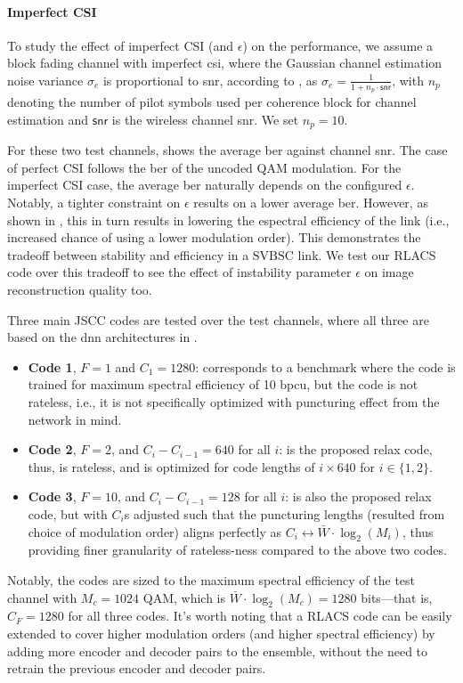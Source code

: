 \paragraph*{Imperfect CSI} To study the effect of imperfect CSI (and $\epsilon$) on the performance, we assume a  block fading channel with imperfect  \gls{csi}, where the Gaussian channel estimation noise variance $\sigma_e$ is proportional to \gls{snr}, according to \cite{1193803,9206086}, as  $\sigma_e = \frac{1}{1+n_p \cdot \mathsf{snr}}$, with $n_p$ denoting the number of pilot symbols used per coherence block for channel estimation and $\mathsf{snr}$ is the wireless channel \gls{snr}. We set $n_p = 10$.

For these two test channels,  shows the average  \gls{ber} against channel \gls{snr}. The case of perfect CSI follows the \gls{ber} of the uncoded QAM modulation. For the imperfect CSI case, the average \gls{ber} naturally depends on the configured $\epsilon$. Notably, a tighter constraint on $\epsilon$ results on  a lower average \gls{ber}. However, as shown in , this in turn results in lowering the espectral efficiency of the link (i.e., increased chance of using a lower modulation order). This demonstrates the tradeoff between stability and efficiency in a $\text{SVBSC}$ link. We test our RLACS code over this tradeoff to see the effect of instability parameter $\epsilon$ on image reconstruction quality too.





Three main JSCC codes are tested over the test channels, where all three are based on the  \gls{dnn} architectures in . 
\begin{itemize}
    \item \textbf{Code 1},  $F = 1$ and $C_1 = 1280$: corresponds to a benchmark where the code is trained for maximum spectral efficiency of 10 bpcu, but the code is not rateless, i.e., it is not specifically optimized with puncturing effect from the network in mind. 
    \item \textbf{Code 2}, $F = 2$, and $C_i-C_{i-1} = 640$ for all $i$: is the proposed \gls{relax} code, thus, is rateless, and is optimized  for code lengths of $i \times 640$ for $i \in \{1, 2\}$. 
    \item \textbf{Code 3}, $F = 10$, and $C_i-C_{i-1} = 128$ for all $i$: is also the proposed \gls{relax} code, but with $C_i$s adjusted such that the puncturing lengths (resulted from choice of modulation order) aligns perfectly as $C_i \leftrightarrow \bar{W} \cdot \log_2(M_i)$, thus providing finer granularity of rateless-ness compared to the above two codes. 
\end{itemize}
Notably, the codes are sized to the maximum spectral efficiency of the test channel with $M_c = 1024$ QAM, which is $\bar{W} \cdot \log_2(M_c) = 1280$ bits---that is, $C_F = 1280$ for all three codes. It's worth noting that a RLACS code  can be easily extended to cover higher modulation orders (and higher spectral efficiency) by adding more encoder and decoder pairs to the ensemble, without the need to retrain the previous encoder and decoder pairs.

